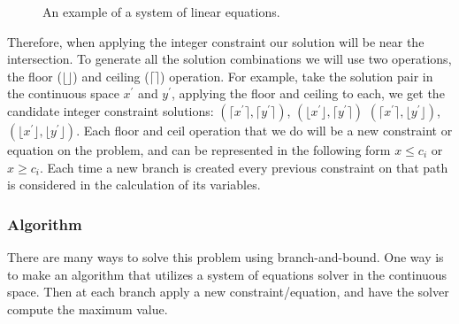         \begin{figure}[H]
            \begin{center}
            \end{center}
            \caption{An example of a system of linear equations.}
        \end{figure}
        
        Therefore, when applying the integer constraint our
        solution will be near the intersection. To generate all the solution combinations we will 
        use two operations, the floor ($\lfloor \rfloor$) and ceiling ($\lceil \rceil$) operation. 
        For example, take the solution pair in the continuous space $x^{'}$ and $y^{'}$,
        applying the floor and ceiling to each, we get the candidate integer constraint solutions:  
        $(\lceil x^{'} \rceil, \lceil y^{'} \rceil)$, $(\lfloor x^{'} \rfloor, \lceil y^{'} \rceil)$
        $(\lceil x^{'} \rceil, \lfloor y^{'} \rfloor)$, $(\lfloor x^{'} \rfloor, \lfloor y^{'} \rfloor)$.
        Each floor and ceil operation that we do will be a new constraint or equation on the problem,
        and can be represented in the following form $x \leq c_i$ or $x \geq c_i$. 
        Each time a new branch is created every previous constraint on that path is 
        considered in the calculation of its variables.

        \subsubsection{Algorithm}
        There are many ways to solve this problem using branch-and-bound.
        One way is to make an algorithm that utilizes a system of equations solver in the continuous space.
        Then at each branch apply a new constraint/equation, and have the solver compute the maximum value.

        